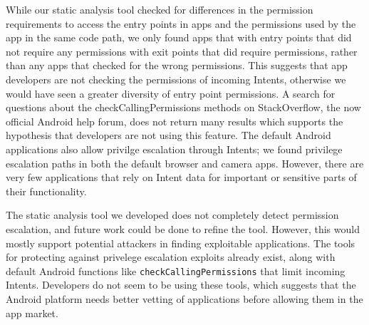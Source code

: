 \documentclass[12pt,a4paper]{article}
\begin{document}
While our static analysis tool checked for differences in the permission
requirements to access the entry points in apps and the permissions used by the
app in the same code path, we only found apps that with entry points that did
not require any permissions with exit points that did require permissions,
rather than any apps that checked for the wrong permissions.  This suggests that
app developers are not checking the permissions of incoming Intents, otherwise
we would have seen a greater diversity of entry point permissions. A search for
questions about the checkCallingPermissions methods on StackOverflow, the now
official Android help forum, does not return many results which supports the
hypothesis that developers are not using this feature. The default Android
applications also allow privilge escalation through Intents; we found privilege
escalation paths in both the default browser and camera apps.  However, there
are very few applications that rely on Intent data for important or sensitive
parts of their functionality.

The static analysis tool we developed does not completely detect permission
escalation, and future work could be done to refine the tool. However, this
would mostly support potential attackers in finding exploitable applications.
The tools \cite{lu_chex_2012} for protecting against privelege escalation
exploits already exist, along with default Android functions like
\texttt{checkCallingPermissions} that limit incoming Intents. Developers do not seem to
be using these tools, which suggests that the Android platform needs better
vetting of applications before allowing them in the app market.

\end{document}
